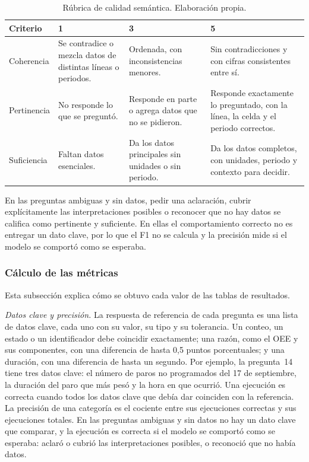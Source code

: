 \begin{table}[H]
\centering
\caption{Rúbrica de calidad semántica. Elaboración propia.}
\label{tab:rubrica}
\small
\renewcommand{\arraystretch}{1.3}
\begin{tabular}{p{2.4cm}p{3.5cm}p{3.5cm}p{3.5cm}}
\hline
\textbf{Criterio} & \textbf{1} & \textbf{3} & \textbf{5} \\
\hline
Coherencia & Se contradice o mezcla datos de distintas líneas o periodos. & Ordenada, con inconsistencias menores. & Sin contradicciones y con cifras consistentes entre sí. \\
Pertinencia & No responde lo que se preguntó. & Responde en parte o agrega datos que no se pidieron. & Responde exactamente lo preguntado, con la línea, la celda y el periodo correctos. \\
Suficiencia & Faltan datos esenciales. & Da los datos principales sin unidades o sin periodo. & Da los datos completos, con unidades, periodo y contexto para decidir. \\
\hline
\end{tabular}
\end{table}

En las preguntas ambiguas y sin datos, pedir una aclaración, cubrir explícitamente las interpretaciones posibles o reconocer que no hay datos se califica como pertinente y suficiente. En ellas el comportamiento correcto no es entregar un dato clave, por lo que el F1 no se calcula y la precisión mide si el modelo se comportó como se esperaba.

\subsubsection{Cálculo de las métricas}
\label{calculometricas}

Esta subsección explica cómo se obtuvo cada valor de las tablas de resultados.

\textit{Datos clave y precisión.} La respuesta de referencia de cada pregunta es una lista de datos clave, cada uno con su valor, su tipo y su tolerancia. Un conteo, un estado o un identificador debe coincidir exactamente; una razón, como el OEE y sus componentes, con una diferencia de hasta 0,5 puntos porcentuales; y una duración, con una diferencia de hasta un segundo. Por ejemplo, la pregunta~14 tiene tres datos clave: el número de paros no programados del 17 de septiembre, la duración del paro que más pesó y la hora en que ocurrió. Una ejecución es correcta cuando todos los datos clave que debía dar coinciden con la referencia. La precisión de una categoría es el cociente entre sus ejecuciones correctas y sus ejecuciones totales. En las preguntas ambiguas y sin datos no hay un dato clave que comparar, y la ejecución es correcta si el modelo se comportó como se esperaba: aclaró o cubrió las interpretaciones posibles, o reconoció que no había datos.

